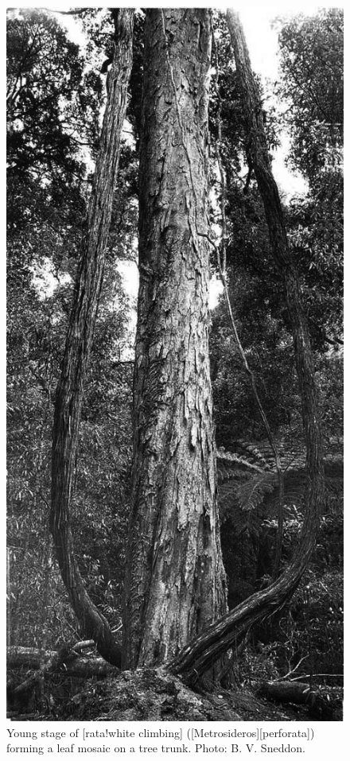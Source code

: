 {\begin{figure}[!t]
\begin{minipage}[t]{0.9\textwidth}
\begin{minipage}[t]{(\textwidth-\fgap) * \real{0.463}}
				\caption[Young stage of white climbing rata]{Young stage of [rata!white climbing] ([Metrosideros][perforata]) forming a leaf mosaic on a tree trunk. Photo: B. V. Sneddon.}%
				\label{fig:30rata}
			\end{minipage}\hspace{\fgap}%
			\begin{minipage}[t]{(\textwidth-\fgap) * \real{0.537}}
				\centering
				\includegraphics[width=\textwidth]{graphics/figure31perforata.jpg}

\end{minipage}
\end{minipage}
\end{figure}}
